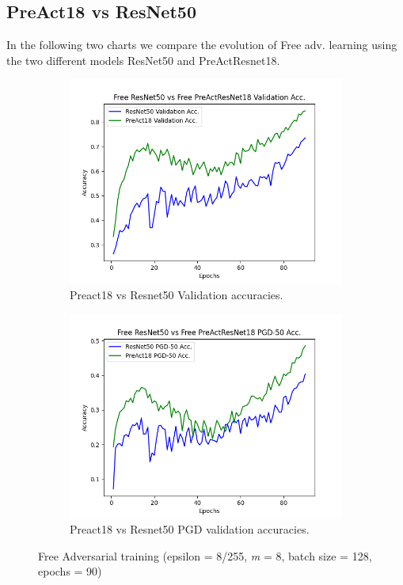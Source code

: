 \documentclass{article}
\begin{document}
\subsection{PreAct18 vs ResNet50}
In the following two charts we compare the evolution of Free adv. learning using
the two different models ResNet50 and PreActResnet18. 



\begin{figure}[hbt!]
  \centering
  \begin{subfigure}[b]{0.4\linewidth}
    \includegraphics[width=\linewidth]{images/freeComp/Figure_1.png}
    \caption{Preact18 vs Resnet50  Validation accuracies.}
  \end{subfigure}
  \begin{subfigure}[b]{0.4\linewidth}
    \includegraphics[width=\linewidth]{images/freeComp/Figure_2.png}
    \caption{Preact18 vs Resnet50 PGD validation accuracies.}
  \end{subfigure}
  \caption{Free Adversarial training (epsilon = 8/255, \textit{m} = 8, batch size = 128,  epochs = 90)}
  \label{fig:coffee}
\end{figure}
\end{document}
